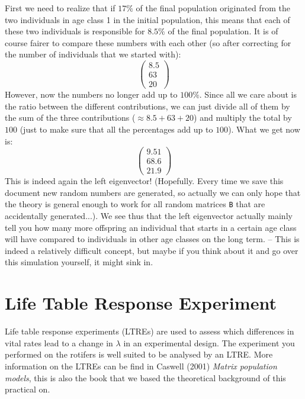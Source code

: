 \documentclass{article}\usepackage[]{graphicx}\usepackage[]{color}
\begin{document}
\begin{mdframed}
First we need to realize that if $17\% $ of the final population originated from the two individuals in age class 1 in the initial population, this means that each of these two individuals is responsible for $8.5\% $ of the final population. It is of course fairer to compare these numbers with each other (so after correcting for the number of individuals that we started with):
\begin{equation*}
\begin{pmatrix}
8.5 \\
63 \\
20
\end{pmatrix}
\end{equation*}
However, now the numbers no longer add up to $100\%$. Since all we care about is the ratio between the different contributions, we can just divide all of them by the sum of the three contributions ($\approx 8.5 +63 + 20 $) and multiply the total by $100$ (just to make sure that all the percentages add up to $100$). What we get now is: 
\begin{equation*}
\begin{pmatrix}
9.51 \\
68.6 \\
21.9
\end{pmatrix}
\end{equation*}
This is indeed again the left eigenvector! (Hopefully. Every time we save this document new random numbers are generated, so actually we can only hope that the theory is general enough to work for all random matrices \texttt{B} that are accidentally generated...). We see thus that the left eigenvector actually mainly tell you how many more offspring an individual that starts in a certain age class will have compared to individuals in other age classes on the long term. -- This is indeed a relatively difficult concept, but maybe if you think about it and go over this simulation yourself, it might sink in.
\end{mdframed}
\section{Life Table Response Experiment}
Life table response experiments (LTREs) are used to assess which  differences in vital rates lead to a change in $\lambda$ in an experimental design. The experiment you performed on the rotifers is well suited to be analysed by an LTRE. More information on the LTREs can be find in Caswell (2001) \textit{Matrix population models}, this is also the book that we based the theoretical background of this practical on. 
\end{document}
